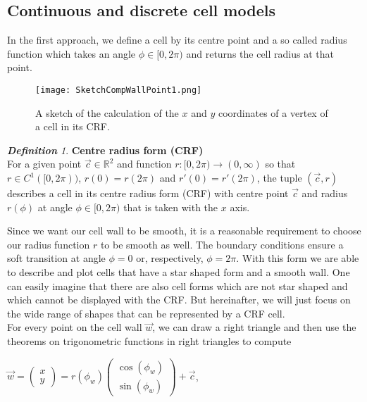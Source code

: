 \documentclass[a4paper,12pt,leqno]{article}
\theoremstyle{plain}
\theoremstyle{remark}
\newtheorem{definition}[theorem]{\bf Definition}
\begin{document}
\subsection{Continuous and discrete cell models} 
In the first approach, we define a cell by its centre point and a so called radius function which takes an angle $\phi \in [0, 2\pi)$ and returns the cell radius at that point. \\
\begin{figure}[b!]
	\begin{center}
		\texttt{[image: SketchCompWallPoint1.png]}
		\caption{A sketch of the calculation of the $x$ and $y$ coordinates of a vertex of a cell in its CRF.}
		\label{fig:SketchCompWallPoint1}
	\end{center}
\end{figure}
\begin{definition} \textbf{Centre radius form (CRF)} \label{def:CRF}  \\
	For a given point $\vec{c} \in \mathbb{R}^2$ and function $r: [0, 2\pi) \rightarrow (0, \infty)$ so that $r \in C^1([0, 2\pi))$, $r(0) = r(2\pi)$ and $r'(0) = r'(2\pi)$, the tuple $(\vec{c}, r)$ describes a cell in its centre radius form (CRF) with centre point $\vec{c}$ and radius $r(\phi)$ at angle $\phi \in [0, 2\pi)$ that is taken with the $x$ axis. \\
\end{definition}
Since we want our cell wall to be smooth, it is a reasonable requirement to choose our radius function $r$ to be smooth as well. The boundary conditions ensure a soft transition at angle $\phi = 0$ or, respectively, $\phi = 2\pi$. 
With this form we are able to describe and plot cells that have a star shaped form and a smooth wall. One can easily imagine that there are also cell forms which are not star shaped and which cannot be displayed with the CRF. But hereinafter, we will just focus on the wide range of shapes that can be represented by a CRF cell. \\
For every point on the cell wall $\vec{w}$, we can draw a right triangle and then use the theorems on trigonometric functions in right triangles to compute
\begin{center}
	$\vec{w} = \begin{pmatrix} x \\ y \end{pmatrix} = r(\phi_{w}) \begin{pmatrix} \cos(\phi_{w}) \\ \sin(\phi_{w}) \end{pmatrix} + \vec{c}$, 
\end{center}
\end{document}
